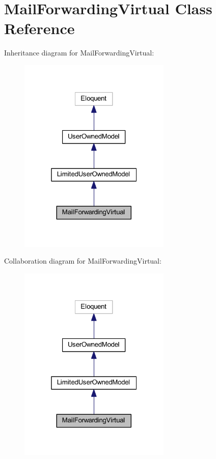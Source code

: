 \hypertarget{class_mail_forwarding_virtual}{}\section{Mail\+Forwarding\+Virtual Class Reference}
\label{class_mail_forwarding_virtual}


Inheritance diagram for Mail\+Forwarding\+Virtual\+:
\nopagebreak
\begin{figure}[H]
\begin{center}
\leavevmode
\includegraphics[width=205pt]{class_mail_forwarding_virtual__inherit__graph}
\end{center}
\end{figure}


Collaboration diagram for Mail\+Forwarding\+Virtual\+:
\nopagebreak
\begin{figure}[H]
\begin{center}
\leavevmode
\includegraphics[width=205pt]{class_mail_forwarding_virtual__coll__graph}
\end{center}
\end{figure}

